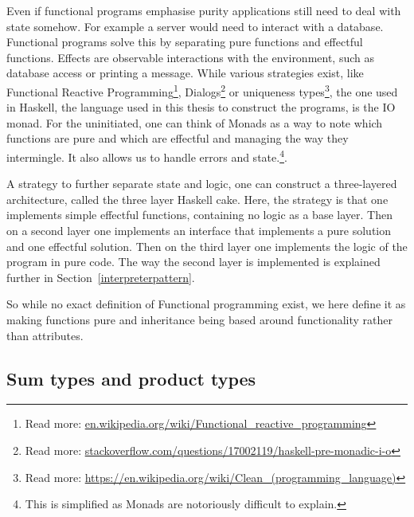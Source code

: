 \begin{description}
Even if functional programs emphasise purity applications still need to deal
        with state somehow. For example a server would need to interact with a
        database. Functional programs solve this by separating pure functions
        and effectful functions. Effects are observable interactions with the
        environment, such as database access or printing a message.  While
        various strategies exist, like Functional Reactive
        Programming\footnote{Read more:
        \url{en.wikipedia.org/wiki/Functional_reactive_programming}},
        Dialogs\footnote{Read more:
        \url{stackoverflow.com/questions/17002119/haskell-pre-monadic-i-o}} or
        uniqueness types\footnote{Read more:
        \url{https://en.wikipedia.org/wiki/Clean_(programming_language)}}, the
        one used in Haskell, the language used in this thesis to construct the
        programs, is the IO monad. For the uninitiated, one can think of Monads
        as a way to note which functions are pure and which are effectful and
        managing the way they intermingle. It also allows us to handle errors
        and state.\footnote{This is simplified as Monads are notoriously
        difficult to explain.}. 

A strategy to further separate state and logic, one can construct a
        three-layered architecture, called the three layer Haskell cake. Here,
        the strategy is that one implements simple effectful functions,
        containing no logic as a base layer. Then on a second layer one
        implements an interface that implements a pure solution and one
        effectful solution. Then on the third layer one implements the logic of
        the program in pure code. The way the second layer is implemented is
        explained further in Section~\ref{interpreterpattern}. 
\end{description}

So while no exact definition of Functional programming exist, we here define it
as making functions pure and inheritance being based around functionality rather
than attributes.

\subsection{Sum types and product types}\label{types}

